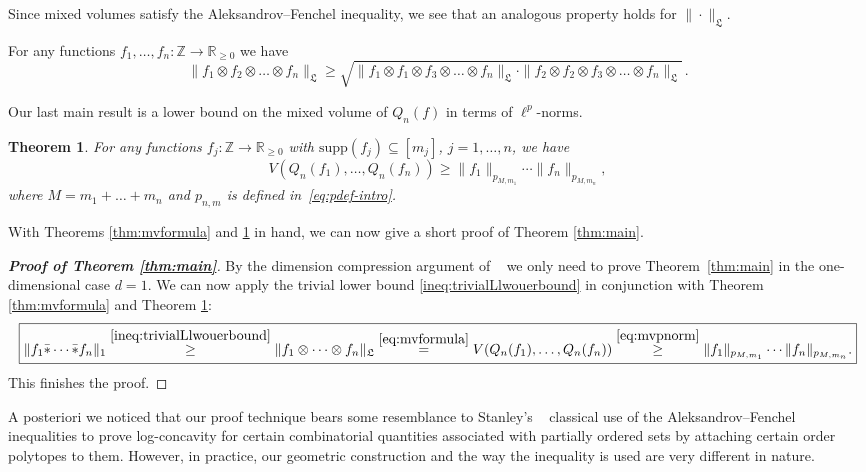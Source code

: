 \documentclass[a4paper,reqno,12pt]{amsart}
\newtheorem{theorem}{Theorem}
\newcommand{\LL}{\mathfrak{L}}
\newcommand{\z}{\mathbb{Z}}
\renewcommand{\r}{\mathbb{R}}
\newcommand{\1}{\bo{1}}
\begin{document}
\noindent Since mixed volumes satisfy the Aleksandrov--Fenchel inequality, we see that an analogous property holds for $\|\cdot\|_{\LL}$.
\begin{corollary} 
For any functions $f_1,\dots,f_n\colon\z\to\r_{\ge0}$ we have
    \begin{equation}
    \|f_1\otimes f_2\otimes \dots \otimes f_n\|_{\LL}\ge 
    \sqrt{\|f_1\otimes f_1\otimes f_3\otimes \dots \otimes f_n\|_{\LL}\cdot \|f_2\otimes f_2\otimes f_3\otimes\dots \otimes f_n\|_{\LL}}\,.
    \end{equation}
\end{corollary}
Our last main result is a lower bound on the mixed volume of $Q_n(f)$ in terms of $\ell^p$-norms.
\begin{theorem}\label{thm:VolLowerbound}
For any functions $f_j:\z\to \r_{\ge0}$ with $\text{supp}(f_j) \subseteq [m_j]$, $j=1,\dots,n$, we have
    \begin{equation} \label{eq:mvpnorm}
   V(Q_n(f_1),\dots,Q_n(f_n)) \geq \|f_1\|_{p_{M,m_1}}\cdots \|f_n\|_{p_{M,m_n}},
	\end{equation}
where $M=m_1+\dots+m_n$ and $p_{n,m}$ is defined in~\eqref{eq:pdef-intro}.
\end{theorem}


With Theorems \ref{thm:mvformula} and \ref{thm:VolLowerbound} in hand, we can now give a short proof of Theorem \ref{thm:main}.

\begin{proof}[\bf Proof of Theorem \ref{thm:main}] By the dimension compression argument of ~\cite[Thm. 2.1]{Be-Iv-Kr-Ma} we only need to prove Theorem~\ref{thm:main} in the one-dimensional case $d=1$. We can now apply the trivial lower bound \eqref{ineq:trivialLlwouerbound} in conjunction with Theorem  \ref{thm:mvformula} and Theorem \ref{thm:VolLowerbound}:
\begin{align}\label{ineq:thechain}
	\boxed{
		\|f_1\bar{*}\cdots\bar{*}f_n\|_1    \overset{\eqref{ineq:trivialLlwouerbound}}{\geq} \|f_1 \otimes \dots \otimes f_n\|_{\LL} \overset{\eqref{eq:mvformula}}{=} V(Q_n(f_1),\dots,Q_n(f_n))  \overset{\eqref{eq:mvpnorm}}{\geq} \|f_1\|_{p_{M,m_1}} \cdots \|f_n\|_{p_{M,m_n}}.
	}
	\end{align}
	This finishes the proof.
\end{proof}


A posteriori we noticed that our proof technique bears some resemblance to Stanley's ~\cite[Thm.~5]{Sta} classical use of the Aleksandrov--Fenchel inequalities to prove log-concavity for certain combinatorial quantities associated with partially ordered sets by attaching certain order polytopes to them. However, in practice, our geometric construction and the way the inequality is used are very different in nature. 
\end{document}
